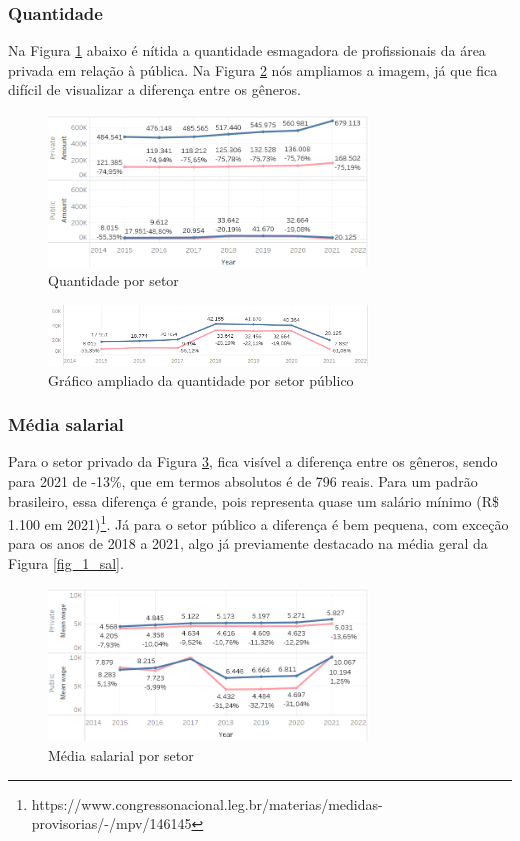 \subsubsection{Quantidade}

Na Figura \ref{fig_3_qnt_pubpriv} abaixo é nítida a quantidade esmagadora de profissionais da área privada em relação à pública. Na Figura  \ref{fig_3_1_qnt_pubpriv} nós ampliamos a imagem, já que fica difícil de visualizar a diferença entre os gêneros.

\begin{figure}[htbp]
	\centerline{
		\includegraphics[width=85mm]{assets/3_qnt_pubpriv.PNG}
	}
	\caption{Quantidade por setor}
	\label{fig_3_qnt_pubpriv}
\end{figure}


\begin{figure}[htbp]
	\centerline{
		\includegraphics[width=85mm]{assets/3_1_qnt_pubpriv.PNG}
	}
	\caption{Gráfico ampliado da quantidade por setor público}
	\label{fig_3_1_qnt_pubpriv}
\end{figure}

\subsubsection{Média salarial}

Para o setor privado da Figura \ref{fig_3_sal_pubpriv}, fica visível a diferença entre os gêneros, sendo para 2021 de -13\%, que em termos absolutos é de 796 reais. Para um padrão brasileiro, essa diferença é grande, pois representa quase um salário mínimo (R\$ 1.100 em 2021)\footnote{https://www.congressonacional.leg.br/materias/medidas-provisorias/-/mpv/146145}. Já para o setor público a diferença é bem pequena, com exceção para os anos de 2018 a 2021, algo já previamente destacado na média geral da Figura \ref{fig_1_sal}.

\begin{figure}[htbp]
	\centerline{
		\includegraphics[width=85mm]{assets/3_sal_pubpriv.PNG}
	}
	\caption{Média salarial por setor}
	\label{fig_3_sal_pubpriv}
\end{figure}

